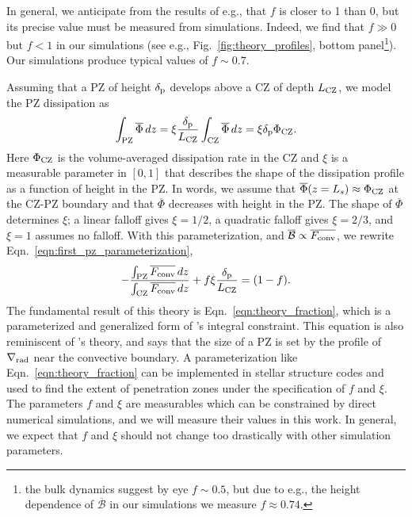 \documentclass[twocolumn]{aastex631}
\newcommand{\gradrad}{\ensuremath{\nabla_{\rm{rad}}}}
\newcommand{\delp}{\ensuremath{\delta_{\rm{p}}}}
\newcommand{\Fconv}{\ensuremath{F_{\rm{conv}}}}
\renewcommand{\bar}[1]{\overline{#1}}
\begin{document}
In general, we anticipate from the results of e.g., \citet{currie_browning_2017} that $f$ is closer to 1 than 0, but its precise value must be measured from simulations.
Indeed, we find that $f \gg 0$ but $f < 1$ in our simulations (see e.g., Fig.~\ref{fig:theory_profiles}, bottom panel\footnote{the bulk dynamics suggest by eye $f \sim 0.5$, but due to e.g., the height dependence of $\bar{\mathcal{B}}$ in our simulations we measure $f \approx 0.74$.}).
Our simulations produce typical values of $f \sim 0.7$.

Assuming that a PZ of height $\delp$ develops above a CZ of depth $L_{\rm{CZ}}$, we model the PZ dissipation as
\begin{equation}
\int_{\rm{PZ}} \bar{\Phi}\,dz = \xi\frac{\delp}{L_{\rm{CZ}}}\int_{\rm{CZ}}\bar{\Phi}\,dz = \xi \delp \Phi_{\rm{CZ}}.
\label{eqn:xi_defn}
\end{equation}
Here $\Phi_{\rm{CZ}}$ is the volume-averaged dissipation rate in the CZ and $\xi$ is a measurable parameter in ${[0, 1]}$ that describes the shape of the dissipation profile as a function of height in the PZ.
In words, we assume that $\bar{\Phi}(z = L_s) \approx \Phi_{\rm{CZ}}$ at the CZ-PZ boundary and that $\bar{\Phi}$ decreases with height in the PZ.
The shape of $\bar{\Phi}$ determines $\xi$; a linear falloff gives $\xi = 1/2$, a quadratic falloff gives $\xi = 2/3$, and $\xi = 1$ assumes no falloff.
With this parameterization, and $\bar{\mathcal{B}} \propto \bar{\Fconv}$, we rewrite Eqn.~\ref{eqn:first_pz_parameterization},
\begin{equation}
-\frac{\int_{\rm{PZ}}\bar{\Fconv}\,dz}{\int_{\rm{CZ}}\bar{\Fconv}\,dz} + f\xi\frac{\delp}{L_{\rm{CZ}}}
= (1 - f).
\label{eqn:theory_fraction}
\end{equation}
The fundamental result of this theory is Eqn.~\ref{eqn:theory_fraction}, which is a parameterized and generalized form of \citet{roxburgh1989}'s integral constraint.
This equation is also reminiscent of \citet{zahn1991}'s theory, and says that the size of a PZ is set by the profile of $\gradrad$ near the convective boundary.
A parameterization like Eqn.~\ref{eqn:theory_fraction} can be implemented in stellar structure codes and used to find the extent of penetration zones under the specification of $f$ and $\xi$.
The parameters $f$ and $\xi$ are measurables which can be constrained by direct numerical simulations, and we will measure their values in this work.
In general, we expect that $f$ and $\xi$ should not change too drastically with other simulation parameters.
\end{document}
